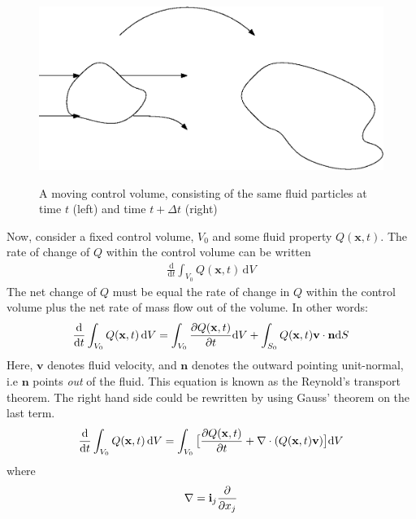 \begin{center}
\begin{figure}[!ht]
\includegraphics[scale=0.8]{figures/Moving_control_volume}\\
\caption{A moving control volume, consisting of the same fluid particles at time $t$ (left) and time $t+\Delta t$ (right) }
\end{figure}
\end{center}
Now, consider a fixed control volume, $V_0$ and some fluid property $Q(\mathbf{x},t)$. The rate of change of $Q$ within the control volume can be written
\begin{align}
\frac{\mathrm{d}}{\mathrm{d}t} \int_{V_0} Q(\mathbf{x},t) \, \mathrm{d}V \label{Rate_of_change}
\end{align}
The net change of $Q$ must be equal the rate of change in $Q$ within the control volume plus the net rate of mass flow out of the volume. In other words:
\begin{align}
\frac{\mathrm{d}}{\mathrm{d}t} \int_{V_0} Q(\mathbf{x},t) \, \mathrm{d}V = \int_{V_0} \frac{\partial Q(\mathbf{x},t)}{\partial t} \mathrm{d}V + \int_{S_0} Q(\mathbf{x},t) \mathbf{v} \cdot \mathbf{n} \mathrm{d}S \label{Reynolds}
\end{align}
Here, $\mathbf{v}$ denotes fluid velocity, and $\mathbf{n}$ denotes the outward pointing unit-normal, i.e $\mathbf{n}$ points \textit{out} of the fluid. This equation is known as the Reynold's transport theorem. The right hand side could be rewritten by using Gauss' theorem on the last term. 
\begin{align}
\frac{\mathrm{d}}{\mathrm{d}t} \int_{V_0} Q(\mathbf{x},t) \, \mathrm{d}V = \int_{V_0} \big{[}\frac{\partial Q(\mathbf{x},t)}{\partial t} + \nabla \cdot (Q(\mathbf{x},t) \mathbf{v}) \big{]}\mathrm{d}V \label{Reynold}
\end{align}
where \[ \nabla = \mathbf{i}_j\frac{\partial }{\partial x_j} \]
